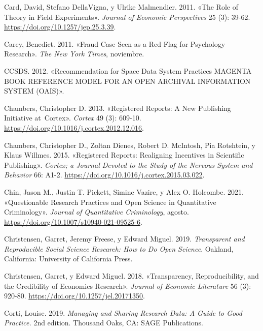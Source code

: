 \documentclass[
  spanish,
  a4paper,
  oneside]{scrbook}
\newlength{\cslhangindent}
\newenvironment{CSLReferences}[2] %
 {\begin{list}{}{%
  \setlength{\itemindent}{0pt}
  \setlength{\leftmargin}{0pt}
  \setlength{\parsep}{0pt}
  \ifodd #1
   \setlength{\leftmargin}{\cslhangindent}
   \setlength{\itemindent}{-1\cslhangindent}
  \fi
  \setlength{\itemsep}{#2\baselineskip}}}
 {\end{list}}
\begin{document}
\begin{CSLReferences}{1}{0}
Card, David, Stefano DellaVigna, y Ulrike Malmendier. 2011. {«The {Role}
of {Theory} in {Field Experiments}»}. \emph{Journal of Economic
Perspectives} 25 (3): 39-62. \url{https://doi.org/10.1257/jep.25.3.39}.

Carey, Benedict. 2011. {«Fraud {Case Seen} as a {Red Flag} for
{Psychology Research}»}. \emph{The New York Times}, noviembre.

CCSDS. 2012. {«Recommendation for {Space Data System Practices MAGENTA
BOOK REFERENCE MODEL FOR AN OPEN ARCHIVAL INFORMATION SYSTEM}
({OAIS})»}.

Chambers, Christopher D. 2013. {«Registered {Reports}: {A} New
Publishing Initiative at~{Cortex}»}. \emph{Cortex} 49 (3): 609-10.
\url{https://doi.org/10.1016/j.cortex.2012.12.016}.

Chambers, Christopher D., Zoltan Dienes, Robert D. McIntosh, Pia
Rotshtein, y Klaus Willmes. 2015. {«Registered Reports: Realigning
Incentives in Scientific Publishing»}. \emph{Cortex; a Journal Devoted
to the Study of the Nervous System and Behavior} 66: A1-2.
\url{https://doi.org/10.1016/j.cortex.2015.03.022}.

Chin, Jason M., Justin T. Pickett, Simine Vazire, y Alex O. Holcombe.
2021. {«Questionable {Research Practices} and {Open Science} in
{Quantitative Criminology}»}. \emph{Journal of Quantitative
Criminology}, agosto. \url{https://doi.org/10.1007/s10940-021-09525-6}.

Christensen, Garret, Jeremy Freese, y Edward Miguel. 2019.
\emph{Transparent and Reproducible Social Science Research: How to Do
Open Science}. Oakland, California: University of California Press.

Christensen, Garret, y Edward Miguel. 2018. {«Transparency,
{Reproducibility}, and the {Credibility} of {Economics Research}»}.
\emph{Journal of Economic Literature} 56 (3): 920-80.
\url{https://doi.org/10.1257/jel.20171350}.

Corti, Louise. 2019. \emph{Managing and {Sharing Research Data}: {A
Guide} to {Good Practice}.} 2nd edition. Thousand Oaks, CA: SAGE
Publications.


\end{CSLReferences}
\end{document}
